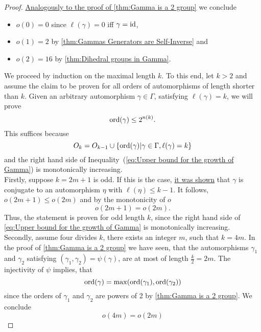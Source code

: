 \begin{proof}
\hyperlink{thm:Base Case}{Analogously to the proof of \cref*{thm:Gamma is a 2 group}} we conclude
\begin{itemize}
\item $o(0)=0$ since $\ell(\gamma)=0$ iff $\gamma=\operatorname{id}$,
\item $o(1)=2$ by \cref{thm:Gammas Generators are Self-Inverse} and
\item $o(2)=16$ by \cref{thm:Dihedral groups in Gamma}.
\end{itemize}
We proceed by induction on the maximal length $k$. To this end, let $k>2$ and assume the claim to be proven for all orders of automorphisms of length shorter than $k$. Given an arbitrary automorphism $\gamma\in\Gamma$, satisfying $\ell(\gamma)=k$, we will prove
\begin{equation*}
\operatorname{\mathrm{ord}}(\gamma)\leq 2^{n(k)}.
\end{equation*}
This suffices because
\begin{equation*}
O_k=O_{k-1}\cup \lbrace\operatorname{\mathrm{ord}}(\gamma)\vert \gamma\in\Gamma,\ell(\gamma)=k\rbrace
\end{equation*} 
and the right hand side of Inequality~(\ref{eq:Upper bound for the growth of Gamma}) is monotonically increasing.\\
Firstly, suppose $k=2m+1$ is odd. If this is the case, \hyperlink{thm:k is odd}{it was shown} that $\gamma$ is conjugate to an automorphism $\eta$ with $\ell(\eta)\leq k-1$. It follows, $o(2m+1)\leq o(2m)$ and by the monotonicity of $o$
\begin{equation}\label{eq:o(2m+1)=o(2m)}
o(2m+1)=o(2m).
\end{equation}
Thus, the statement is proven for odd length $k$, since the right hand side of \cref{eq:Upper bound for the growth of Gamma} is monotonically increasing.\\
Secondly, assume four divides $k$, \ie there exists an integer $m$, such that $k=4m$. In the proof of \cref{thm:Gamma is a 2 group} we have seen, that the automorphisms $\gamma_1$ and $\gamma_2$ satisfying $(\gamma_1,\gamma_2)=\psi(\gamma)$, are at most of length $\frac{k}{2}=2m$. The injectivity of $\psi$ implies, that
\begin{equation*}
\operatorname{\mathrm{ord}}(\gamma)=\max(\operatorname{\mathrm{ord}}(\gamma_1),\operatorname{\mathrm{ord}}(\gamma_2))
\end{equation*}
since the orders of $\gamma_1$ and $\gamma_2$ are powers of 2 by \cref{thm:Gamma is a 2 group}. We conclude
\begin{equation}
o(4m)=o(2m)\label{eq:o(4m)=o(2m)}

\end{equation}
\end{proof}
